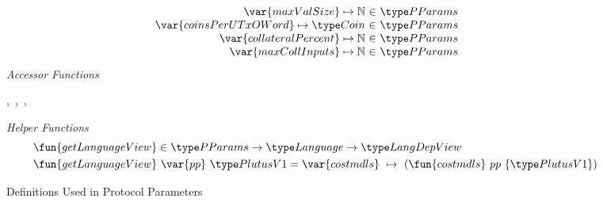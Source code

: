 \begin{figure*}[htb]
\begin{equation*}
\begin{array}{r@{~\in~}l@{\qquad}r}
        \var{maxValSize} \mapsto \N & \PParams \\
        \var{coinsPerUTxOWord} \mapsto \Coin & \PParams \\
        \var{collateralPercent} \mapsto \N & \PParams \\
        \var{maxCollInputs} \mapsto \N & \PParams \\
      \end{array}
  \end{equation*}
  \emph{Accessor Functions}
  \begin{center}
  ,~,~,~
  \end{center}
  \emph{Helper Functions}
  \begin{align*}
    & \fun{getLanguageView} \in \PParams \to \Language \to \LangDepView \\
    & \fun{getLanguageView}~\var{pp}~\PlutusVI = \var{costmdls}~\mapsto~ (\fun{costmdls}~{pp}~\{\PlutusVI\})
  \end{align*}
  \caption{Definitions Used in Protocol Parameters}
  \label{fig:defs:protocol-parameters}
\end{figure*}
